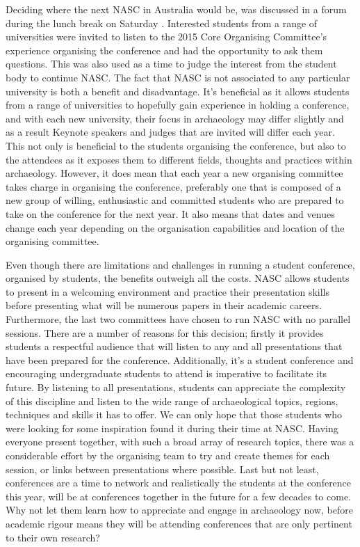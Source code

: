 Deciding where the next NASC in Australia would be, was discussed in a forum during the lunch break on Saturday . Interested students from a range of universities were invited to listen to the 2015 Core Organising Committee’s experience organising the conference and had the opportunity to ask them questions. This was also used as a time to judge the interest from the student body to continue NASC. The fact that NASC is not associated to any particular university is both a benefit and disadvantage. It’s beneficial as it allows students from a range of universities to hopefully gain experience in holding a conference, and with each new university, their focus in archaeology may differ slightly and as a result Keynote speakers and judges that are invited will differ each year. This not only is beneficial to the students organising the conference, but also to the attendees as it exposes them to different fields, thoughts and practices within archaeology. However, it does mean that each year a new organising committee takes charge in organising the conference, preferably one that is composed of a new group of willing, enthusiastic and committed students who are prepared to take on the conference for the next year. It also means that dates and venues change each year depending on the organisation capabilities and location of the organising committee. 

Even though there are limitations and challenges in running a student conference, organised by students, the benefits outweigh all the costs. NASC allows students to present in a welcoming environment and practice their presentation skills before presenting what will be numerous papers in their academic careers. Furthermore, the last two committees have chosen to run NASC with no parallel sessions. There are a number of reasons for this decision; firstly it provides students a respectful audience that will listen to any and all presentations that have been prepared for the conference. Additionally, it’s a student conference and encouraging undergraduate students to attend is imperative to facilitate its future. By listening to all presentations, students can appreciate the complexity of this discipline and listen to the wide range of archaeological topics, regions, techniques and skills it has to offer. We can only hope that those students who were looking for some inspiration found it during their time at NASC. Having everyone present together, with such a broad array of research topics, there was a considerable effort by the organising team to try and create themes for each session, or links between presentations where possible. Last but not least, conferences are a time to network and realistically the students at the conference this year, will be at conferences together in the future for a few decades to come. Why not let them learn how to appreciate and engage in archaeology now, before academic rigour means they will be attending conferences that are only pertinent to their own research? 

